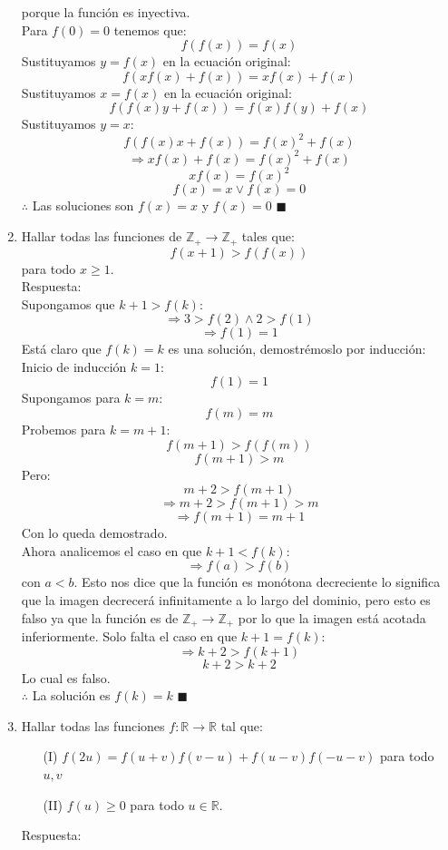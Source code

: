 \documentclass{book}
\newcommand{\R}{\mathbb{R}} \newcommand{\N}{\mathbb{N}}
\newcommand{\Z}{\mathbb{Z}} \def\max{\mathop{\mbox{\rm máx}}} %
\begin{document}
\begin{enumerate}
        porque la función es inyectiva.\\
        Para $f(0)=0$ tenemos que:
        $$f( f(x)) = f(x)$$
        Sustituyamos $y=f(x)$ en la ecuación original:
        $$f(xf(x)+f(x))=xf(x)+f(x)$$
        Sustituyamos $x=f(x)$ en la ecuación original:
        $$f(f(x)y+f(x))=f(x)f(y)+f(x)$$
        Sustituyamos $y=x$:
        $$f(f(x)x+f(x))=f(x)^2+f(x)$$
        $$\Rightarrow xf(x)+f(x)=f(x)^2+f(x)$$
        $$xf(x)=f(x)^2$$
        $$f(x)=x\vee f(x)=0$$
        $\therefore$ Las soluciones son $f(x)=x$ y $f(x)=0$ $\blacksquare$\\
        \item Hallar todas las funciones de $\Z_+\rightarrow\Z_+$ tales que:
        $$f(x+1)>f(f(x))$$
        para todo $x\geq1$.\\
        Respuesta:\\
        Supongamos que $k+1>f(k)$:
        $$\Rightarrow 3> f(2) \wedge 2>f(1)$$
        $$\Rightarrow f(1)=1$$
        Está claro que $f(k)=k$ es una solución, demostrémoslo por inducción:\\
        Inicio de inducción $k=1$:
        $$f(1)=1$$
        Supongamos para $k=m$:
        $$f(m)=m$$
        Probemos para $k=m+1$:
        $$f(m+1)>f(f(m))$$
        $$f(m+1)>m$$
        Pero:
        $$m+2>f(m+1)$$
        $$\Rightarrow m+2>f(m+1)>m$$
        $$\Rightarrow f(m+1)=m+1$$
        Con lo queda demostrado.\\
        Ahora analicemos el caso en que $k+1<f(k)$:
        $$\Rightarrow f(a)>f(b)$$
        con $a<b$. Esto nos dice que la función es monótona decreciente lo significa que la imagen decrecerá infinitamente a lo largo del dominio, pero esto es falso ya que la función es de $\Z_+\rightarrow \Z_+$ por lo que la imagen está acotada inferiormente.
        Solo falta el caso en que $k+1=f(k)$:
        $$\Rightarrow k+2>f(k+1)$$
        $$k+2>k+2$$
        Lo cual es falso.\\
        $\therefore$ La solución es $f(k)=k$ $\blacksquare$\\
        \item Hallar todas las funciones $f:\R\rightarrow\R$   tal que:
        \begin{enumerate}
            \item[(I)] $f(2u) = f(u+v)f(v-u) + f(u-v)f(-u-v)$ para todo $u,v$
            \item[(II)]$f(u) \geq  0$ para todo $u\in \R$.
        \end{enumerate}
        Respuesta:\\

\end{enumerate}
\end{document}
